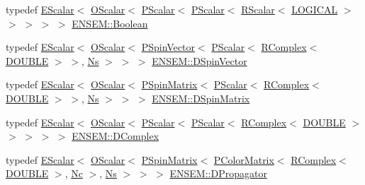 \begin{DoxyCompactItemize}
\item 
typedef \mbox{\hyperlink{classENSEM_1_1EScalar}{E\+Scalar}}$<$ \mbox{\hyperlink{classENSEM_1_1OScalar}{O\+Scalar}}$<$ \mbox{\hyperlink{classENSEM_1_1PScalar}{P\+Scalar}}$<$ \mbox{\hyperlink{classENSEM_1_1PScalar}{P\+Scalar}}$<$ \mbox{\hyperlink{classENSEM_1_1RScalar}{R\+Scalar}}$<$ \mbox{\hyperlink{namespaceENSEM_ade7c8d5976e979516f8c2ecd223dd0b6}{L\+O\+G\+I\+C\+AL}} $>$ $>$ $>$ $>$ $>$ \mbox{\hyperlink{group__defs_ga38f0cd64d26e121e75367986f2d7cd6c}{E\+N\+S\+E\+M\+::\+Boolean}}
\item 
typedef \mbox{\hyperlink{classENSEM_1_1EScalar}{E\+Scalar}}$<$ \mbox{\hyperlink{classENSEM_1_1OScalar}{O\+Scalar}}$<$ \mbox{\hyperlink{classENSEM_1_1PSpinVector}{P\+Spin\+Vector}}$<$ \mbox{\hyperlink{classENSEM_1_1PScalar}{P\+Scalar}}$<$ \mbox{\hyperlink{classENSEM_1_1RComplex}{R\+Complex}}$<$ \mbox{\hyperlink{namespaceENSEM_adcbd0de4e9e0e7ef6aa9b681a554e2c5}{D\+O\+U\+B\+LE}} $>$ $>$, \mbox{\hyperlink{namespaceENSEM_a6f05e048f9b2eb1a19131074f8abc25f}{Ns}} $>$ $>$ $>$ \mbox{\hyperlink{group__defs_gab4f32134903c54aa9441e3bff44b44f5}{E\+N\+S\+E\+M\+::\+D\+Spin\+Vector}}
\item 
typedef \mbox{\hyperlink{classENSEM_1_1EScalar}{E\+Scalar}}$<$ \mbox{\hyperlink{classENSEM_1_1OScalar}{O\+Scalar}}$<$ \mbox{\hyperlink{classENSEM_1_1PSpinMatrix}{P\+Spin\+Matrix}}$<$ \mbox{\hyperlink{classENSEM_1_1PScalar}{P\+Scalar}}$<$ \mbox{\hyperlink{classENSEM_1_1RComplex}{R\+Complex}}$<$ \mbox{\hyperlink{namespaceENSEM_adcbd0de4e9e0e7ef6aa9b681a554e2c5}{D\+O\+U\+B\+LE}} $>$ $>$, \mbox{\hyperlink{namespaceENSEM_a6f05e048f9b2eb1a19131074f8abc25f}{Ns}} $>$ $>$ $>$ \mbox{\hyperlink{group__defs_ga3d56e7ee2403fec93fff9b7d4cd7d7cf}{E\+N\+S\+E\+M\+::\+D\+Spin\+Matrix}}
\item 
typedef \mbox{\hyperlink{classENSEM_1_1EScalar}{E\+Scalar}}$<$ \mbox{\hyperlink{classENSEM_1_1OScalar}{O\+Scalar}}$<$ \mbox{\hyperlink{classENSEM_1_1PScalar}{P\+Scalar}}$<$ \mbox{\hyperlink{classENSEM_1_1PScalar}{P\+Scalar}}$<$ \mbox{\hyperlink{classENSEM_1_1RComplex}{R\+Complex}}$<$ \mbox{\hyperlink{namespaceENSEM_adcbd0de4e9e0e7ef6aa9b681a554e2c5}{D\+O\+U\+B\+LE}} $>$ $>$ $>$ $>$ $>$ \mbox{\hyperlink{group__defs_ga06619af4c8e964a05d234fc7113321a6}{E\+N\+S\+E\+M\+::\+D\+Complex}}
\item 
typedef \mbox{\hyperlink{classENSEM_1_1EScalar}{E\+Scalar}}$<$ \mbox{\hyperlink{classENSEM_1_1OScalar}{O\+Scalar}}$<$ \mbox{\hyperlink{classENSEM_1_1PSpinMatrix}{P\+Spin\+Matrix}}$<$ \mbox{\hyperlink{classENSEM_1_1PColorMatrix}{P\+Color\+Matrix}}$<$ \mbox{\hyperlink{classENSEM_1_1RComplex}{R\+Complex}}$<$ \mbox{\hyperlink{namespaceENSEM_adcbd0de4e9e0e7ef6aa9b681a554e2c5}{D\+O\+U\+B\+LE}} $>$, \mbox{\hyperlink{namespaceENSEM_aabe0c3018e0246aaae1602fa5c08b58a}{Nc}} $>$, \mbox{\hyperlink{namespaceENSEM_a6f05e048f9b2eb1a19131074f8abc25f}{Ns}} $>$ $>$ $>$ \mbox{\hyperlink{group__defs_ga4dacc58a6c2cf15e6072cd6fe4415a7c}{E\+N\+S\+E\+M\+::\+D\+Propagator}}

\end{DoxyCompactItemize}
